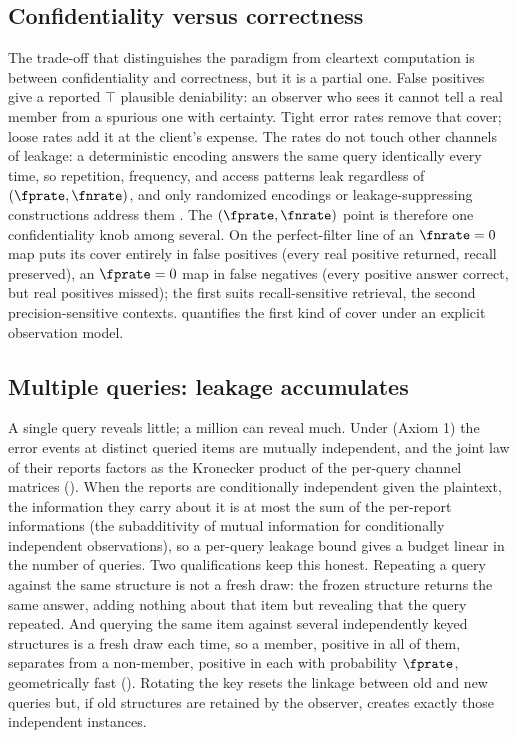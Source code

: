 \subsection*{Confidentiality versus correctness}

The trade-off that distinguishes the paradigm from cleartext computation
is between confidentiality and correctness, but it is a partial one. False
positives give a reported $\top$ plausible deniability: an observer who
sees it cannot tell a real member from a spurious one with certainty.
Tight error rates remove that cover; loose rates add it at the client's
expense. The rates do not touch other channels of leakage: a
deterministic encoding answers the same query identically every time, so
repetition, frequency, and access patterns leak regardless of
$(\fprate, \fnrate)$, and only randomized encodings or leakage-suppressing
constructions address them \parencite{kamara-moataz-ohrimenko-2018}. The
$(\fprate, \fnrate)$ point is therefore one confidentiality knob among
several. On the perfect-filter line of  an
$\fnrate = 0$ map puts its cover entirely in false positives (every real
positive returned, recall preserved), an $\fprate = 0$ map in false
negatives (every positive answer correct, but real positives missed); the
first suits recall-sensitive retrieval, the second precision-sensitive
contexts.  quantifies the first kind
of cover under an explicit observation model.

\subsection*{Multiple queries: leakage accumulates}

A single query reveals little; a million can reveal much. Under
 (Axiom 1) the error events at distinct queried
items are mutually independent, and the joint law of their reports
factors as the Kronecker product of the per-query channel matrices
(). When the reports are conditionally independent
given the plaintext, the information they carry about it is at most the
sum of the per-report informations (the subadditivity of mutual
information for conditionally independent observations), so a per-query
leakage bound gives a budget linear in the number of queries. Two
qualifications keep this honest. Repeating a query against the same
structure is not a fresh draw: the frozen structure returns the same
answer, adding nothing about that item but revealing that the query
repeated. And querying the same item against several independently keyed
structures is a fresh draw each time, so a member, positive in all of
them, separates from a non-member, positive in each with probability
$\fprate$, geometrically fast ().
Rotating the key resets the linkage between old and new queries but, if
old structures are retained by the observer, creates exactly those
independent instances.


